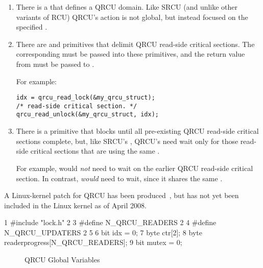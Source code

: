 \begin{enumerate}
\item	There is a  that defines a QRCU domain.
	Like SRCU (and unlike other variants of RCU) QRCU's action
	is not global, but instead focused on the specified
	.
\item	There are  and 
	primitives that delimit QRCU read-side critical sections.
	The corresponding  must be passed into
	these primitives, and the return value from 
	must be passed to .

	For example:

\vspace{5pt}
\begin{minipage}[t]{\columnwidth}
\scriptsize
\begin{verbatim}
idx = qrcu_read_lock(&my_qrcu_struct);
/* read-side critical section. */
qrcu_read_unlock(&my_qrcu_struct, idx);
\end{verbatim}
\end{minipage}
\vspace{5pt}

\item	There is a  primitive that blocks until
	all pre-existing QRCU read-side critical sections complete,
	but, like SRCU's , QRCU's
	 need wait only for those read-side
	critical sections that are using the same .

	For example, 
	would \emph{not} need to wait on the earlier QRCU read-side
	critical section.
	In contrast, 
	\emph{would} need to wait, since it shares the same
	.
\end{enumerate}

A Linux-kernel patch for QRCU has been
produced~\cite{PaulMcKenney2007QRCUpatch},
but has not yet been included in the Linux kernel as of
April 2008.

{ \scriptsize
\begin{verbbox}
  1 #include "lock.h"
  2
  3 #define N_QRCU_READERS 2
  4 #define N_QRCU_UPDATERS 2
  5
  6 bit idx = 0;
  7 byte ctr[2];
  8 byte readerprogress[N_QRCU_READERS];
  9 bit mutex = 0;
\end{verbbox}
}
\begin{figure}[htbp]
\centering
\theverbbox
\caption{QRCU Global Variables}
\label{fig:analysis:QRCU Global Variables}
\end{figure}

